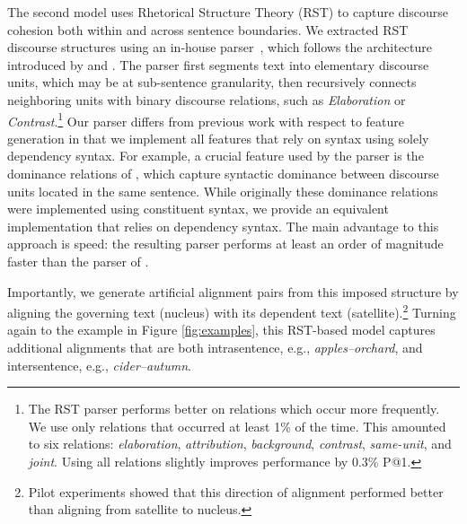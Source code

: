 The second model uses Rhetorical Structure Theory (RST) to capture discourse cohesion both within and across sentence boundaries.  
We extracted RST discourse structures using an in-house parser~\citep{Surdeanu:15}, which follows the architecture introduced by \citet{hernault10} and \citet{feng12}.
The parser first segments text into elementary discourse units, which may be at sub-sentence granularity, then recursively connects neighboring units with binary discourse relations, such as \emph{Elaboration} or \emph{Contrast}.\footnote{The RST parser performs better on relations which occur more frequently.  We use only relations that occurred at least 1\% of the time.  This amounted to six relations: \emph{elaboration}, \emph{attribution}, \emph{background}, \emph{contrast}, \emph{same-unit}, and \emph{joint}. Using all relations slightly improves performance by 0.3\% P@1.} Our parser differs from previous work with respect to feature generation in that we implement all features that rely on syntax using solely dependency syntax. For example, a crucial feature used by the parser is the dominance relations of \citet{soricut2003}, which capture syntactic dominance between discourse units located in the same sentence. While originally these dominance relations were implemented using constituent syntax, we provide an equivalent implementation that relies on dependency syntax. The main advantage to this approach is speed: the resulting parser performs at least an order of magnitude faster than the parser of \citet{feng12}. 

Importantly, we generate artificial alignment pairs from this imposed structure by aligning the governing text (nucleus) with its dependent text (satellite).\footnote{Pilot experiments showed that this direction of alignment performed better than aligning from satellite to nucleus.} 
 Turning again to the example in Figure \ref{fig:examples}, this RST-based model captures additional alignments that are both intrasentence, e.g., \emph{apples--orchard}, and intersentence, e.g., {\em cider--autumn}. 

